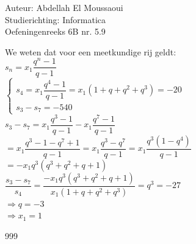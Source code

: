 \documentclass[a4paper]{article}
\begin{document}
  
\noindent \large Auteur: Abdellah El Moussaoui \\
\noindent \large Studierichting: Informatica\\
\noindent \large Oefeningenreeks 6B nr. 5.9\\

\medskip

\normalsize

We weten dat voor een meetkundige rij geldt:\\

$s_n=x_1\dfrac{q^n-1}{q-1}$\\

$\left\{
\begin{array}{l}
s_4=x_1\dfrac{q^4-1}{q-1}=x_1\left(1+q+q^2+q^3\right)=-20\\
s_3-s_7=-540
\end{array}
\right.$\\

$s_3-s_7=x_1\dfrac{q^3-1}{q-1}-x_1\dfrac{q^7-1}{q-1}$\\

$=x_1\dfrac{q^3-1-q^7+1}{q-1} = x_1\dfrac{q^3-q^7}{q-1} = x_1\dfrac{q^3\left(1-q^4\right)}{q-1}$\\

$= -x_1q^3\left(q^3+q^2+q+1\right)$\\

$\dfrac{s_3-s_7}{s_4} = \dfrac{-x_1q^3\left(q^3+q^2+q+1\right)}{x_1\left(1+q+q^2+q^3\right)} = q^3 = -27$\\


$\Rightarrow q=-3$\\

$\Rightarrow x_1=1$\\


\begin{thebibliography}{999}
\end{thebibliography}
\end{document}
